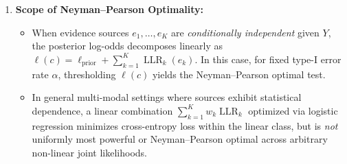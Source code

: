 \begin{theorem}
\begin{enumerate}
    \item \textbf{Scope of Neyman--Pearson Optimality:}
    \begin{itemize}
        \item When evidence sources $e_1, \dots, e_K$ are \emph{conditionally independent} given $Y$, the posterior log-odds decomposes linearly as $\ell(c) = \ell_{\text{prior}} + \sum_{k=1}^K \operatorname{LLR}_k(e_k)$. In this case, for fixed type-I error rate $\alpha$, thresholding $\ell(c)$ yields the Neyman--Pearson optimal test.
        \item In general multi-modal settings where sources exhibit statistical dependence, a linear combination $\sum_{k=1}^K w_k \operatorname{LLR}_k$ optimized via logistic regression minimizes cross-entropy loss within the linear class, but is \emph{not} uniformly most powerful or Neyman--Pearson optimal across arbitrary non-linear joint likelihoods.
    \end{itemize}
\end{enumerate}
\end{theorem}

